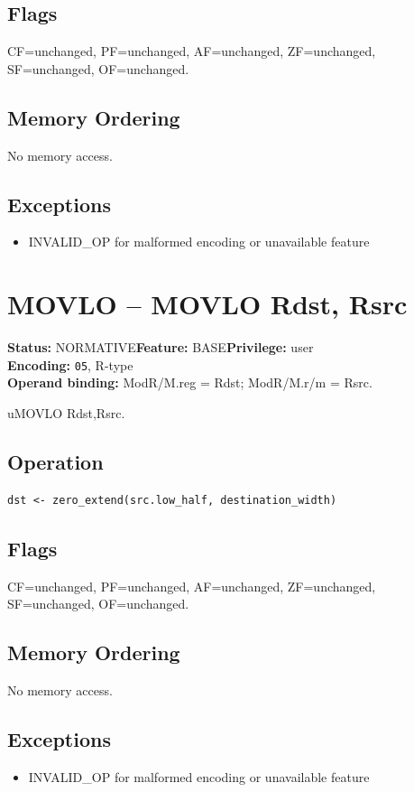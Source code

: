 \documentclass[10pt]{article}
\begin{document}
\subsection*{Flags}
CF=unchanged, PF=unchanged, AF=unchanged, ZF=unchanged, SF=unchanged, OF=unchanged.
\subsection*{Memory Ordering}
No memory access.
\subsection*{Exceptions}
\begin{itemize}
\item INVALID\_OP for malformed encoding or unavailable feature
\end{itemize}
\clearpage

\section{MOVLO -- MOVLO Rdst, Rsrc}
\textbf{Status:} NORMATIVE\quad \textbf{Feature:} BASE\quad \textbf{Privilege:} user\\
\textbf{Encoding:} \texttt{05}, R-type\\
\textbf{Operand binding:} ModR/M.reg = Rdst; ModR/M.r/m = Rsrc.

uMOVLO Rdst,Rsrc.

\subsection*{Operation}
\begin{lstlisting}
dst <- zero_extend(src.low_half, destination_width)
\end{lstlisting}
\subsection*{Flags}
CF=unchanged, PF=unchanged, AF=unchanged, ZF=unchanged, SF=unchanged, OF=unchanged.
\subsection*{Memory Ordering}
No memory access.
\subsection*{Exceptions}
\begin{itemize}
\item INVALID\_OP for malformed encoding or unavailable feature
\end{itemize}
\clearpage
\end{document}
